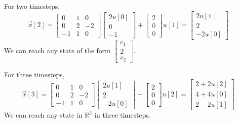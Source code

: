 {\begin{enumerate}
        For two timesteps,
        \[\vec{x}[2] =
        \begin{bmatrix}
            0 & 1 & 0 \\
            0 & 2 & -2 \\
            -1 & 1 & 0
        \end{bmatrix}
        \begin{bmatrix}
            2u[0] \\ 0 \\ -1
        \end{bmatrix}
        + \begin{bmatrix}
            2 \\ 0 \\ 0
        \end{bmatrix} u[1] =
        \begin{bmatrix}
            2u[1] \\ 2 \\ -2u[0]
        \end{bmatrix}\]
        We can reach any state of the form $\begin{bmatrix} c_1 \\ 2 \\ c_2 \end{bmatrix}$. \\
        \newline

        For three timesteps,
        \[\vec{x}[3] =
        \begin{bmatrix}
            0 & 1 & 0 \\
            0 & 2 & -2 \\
            -1 & 1 & 0
        \end{bmatrix}
        \begin{bmatrix}
            2u[1] \\ 2 \\ -2u[0]
        \end{bmatrix}
        + \begin{bmatrix}
            2 \\ 0 \\ 0
        \end{bmatrix} u[2] =
        \begin{bmatrix}
            2 + 2u[2] \\ 4 + 4u[0] \\ 2 - 2u[1]
        \end{bmatrix}\]
        We can reach any state in $\mathbb{R}^3$ in three timesteps.


\end{enumerate}}
